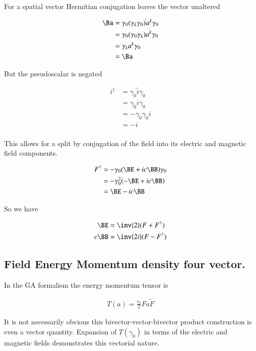 For a spatial vector Hermitian conjugation leaves the vector unaltered

\begin{align*}
\Ba
&= \gamma_0 (\gamma_k \gamma_0)^{\tilde{}} a^k \gamma_0 \\
&= \gamma_0 (\gamma_0 \gamma_k) a^k \gamma_0 \\
&= \gamma_k a^k \gamma_0 \\
&= \Ba
\end{align*}

But the pseudoscalar is negated

\begin{align*}
i^\dagger
&=
\gamma_0 \tilde{i} \gamma_0 \\
&=
\gamma_0 i \gamma_0 \\
&=
-\gamma_0 \gamma_0 i \\
&=
- i \\
\end{align*}

This allows for a split by conjugation of the field into its electric and magnetic field components.

\begin{align*}
F^\dagger
&= -\gamma_0 ( \BE + i c \BB) \gamma_0 \\
&= -\gamma_0^2 ( -\BE + i c \BB) \\
&= \BE - i c\BB \\
\end{align*}

So we have

\begin{align}\label{eqn:conjuagateSplit}
\BE &= \inv{2}(F + F^\dagger) \\
c \BB &= \inv{2i}(F - F^\dagger)
\end{align}

\subsection{ Field Energy Momentum density four vector.}

In the GA formalism the energy momentum tensor is

\begin{align}
T(a) = \frac{\epsilon_0}{2} F a \tilde{F}
\end{align}

It is not necessarily obvious this bivector-vector-bivector product construction is even a vector quantity.  Expansion of $T(\gamma_0)$ in terms of the electric and magnetic fields demonstrates this vectorial nature.

